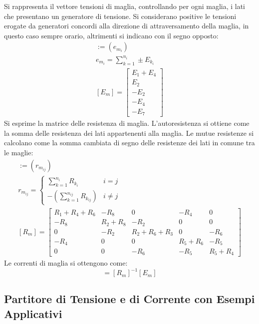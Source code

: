 \documentclass{article}
\numberwithin{equation}{subsection}
\begin{document}
Si rappresenta il vettore tensioni di maglia, controllando per ogni maglia, i lati che presentano un generatore di tensione. Si considerano positive le tensioni erogate 
da generatori concordi alla direzione di attraversamento della maglia, in questo caso sempre orario, altrimenti si indicano con il segno opposto:
\begin{gather*}
    [E_m]:=(e_{m_{i}})\\
    e_{m_i}=\displaystyle\sum_{k=1}^{n_i}\pm E_{k_i}\\
    [E_m]=\begin{bmatrix}
        E_1+E_4\\
        E_2\\
        -E_2\\
        -E_4\\
        -E_7
    \end{bmatrix}
\end{gather*}
Si esprime la matrice delle resistenza di maglia. L'autoresistenza si ottiene come la somma delle resistenza dei lati appartenenti alla maglia. Le mutue resistenze si calcolano 
come la somma cambiata di segno delle resistenze dei lati in comune tra le maglie:
\begin{gather*}
    [R_m]:=(r_{m_{ij}})\\
    r_{m_{ij}}=\begin{cases}
        \displaystyle\sum_{k=1}^{n_i}R_{k_i}& i=j\\
        \displaystyle-\left(\sum_{k=1}^{n_{ij}}R_{k_{ij}}\right)& i\neq j
    \end{cases}\\
    [R_m]=\begin{bmatrix}
        R_1+R_4+R_6&-R_8&0&-R_4&0\\
        -R_8&R_2+R_8&-R_2&0&0\\
        0&-R_2&R_2+R_6+R_3&0&-R_6\\
        -R_4&0&0&R_5+R_6&-R_5\\
        0&0&-R_6&-R_5&R_5+R_4
    \end{bmatrix}
\end{gather*}
Le correnti di maglia si ottengono come:
\begin{equation*}
    [I_m]=[R_m]^{-1}[E_m]
\end{equation*}

\subsection{Partitore di Tensione e di Corrente con Esempi Applicativi}
\end{document}
